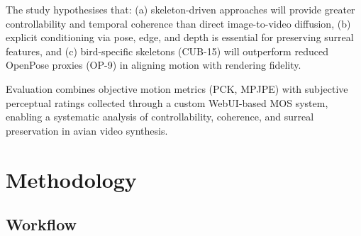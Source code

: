 \documentclass[final-report]{report-template}
\begin{document}
The study hypothesises that: (a) skeleton-driven approaches will provide greater controllability and temporal coherence than direct image-to-video diffusion, (b) explicit conditioning via pose, edge, and depth is essential for preserving surreal features, and (c) bird-specific skeletons (CUB-15) will outperform reduced OpenPose proxies (OP-9) in aligning motion with rendering fidelity.  

Evaluation combines objective motion metrics (PCK, MPJPE) with subjective perceptual ratings collected through a custom WebUI-based MOS system, enabling a systematic analysis of controllability, coherence, and surreal preservation in avian video synthesis.


\newpage

\section{Methodology}

\subsection{Workflow}




\end{document}

